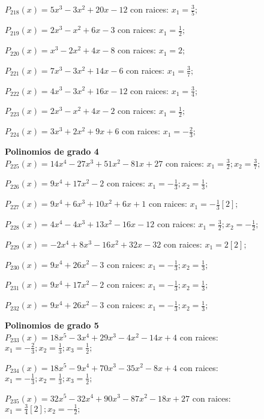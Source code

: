 \subitem $P_{218}(x) = 5x^3 - 3x^2 + 20x - 12$ con raices: $x_1 = \frac{3}{5} ;  $

\subitem $P_{219}(x) = 2x^3 - x^2 + 6x - 3$ con raices: $x_1 = \frac{1}{2} ;  $

\subitem $P_{220}(x) = x^3 - 2x^2 + 4x - 8$ con raices: $x_1 = 2 ;  $

\subitem $P_{221}(x) = 7x^3 - 3x^2 + 14x - 6$ con raices: $x_1 = \frac{3}{7} ;  $

\subitem $P_{222}(x) = 4x^3 - 3x^2 + 16x - 12$ con raices: $x_1 = \frac{3}{4} ;  $

\subitem $P_{223}(x) = 2x^3 - x^2 + 4x - 2$ con raices: $x_1 = \frac{1}{2} ;  $

\subitem $P_{224}(x) = 3x^3 + 2x^2 + 9x + 6$ con raices: $x_1 = -\frac{2}{3} ;  $

\textbf{Polinomios de grado 4\\} 
\subitem $P_{225}(x) = 14x^4 - 27x^3 + 51x^2 - 81x + 27$ con raices: $x_1 = \frac{3}{2} ; x_2 = \frac{3}{7} ;  $

\subitem $P_{226}(x) = 9x^4 + 17x^2 - 2$ con raices: $x_1 = -\frac{1}{3} ; x_2 = \frac{1}{3} ;  $

\subitem $P_{227}(x) = 9x^4 + 6x^3 + 10x^2 + 6x + 1$ con raices: $x_1 = -\frac{1}{3}[2] ;  $

\subitem $P_{228}(x) = 4x^4 - 4x^3 + 13x^2 - 16x - 12$ con raices: $x_1 = \frac{3}{2} ; x_2 = -\frac{1}{2} ;  $

\subitem $P_{229}(x) = -2x^4 + 8x^3 - 16x^2 + 32x - 32$ con raices: $x_1 = 2[2] ;  $

\subitem $P_{230}(x) = 9x^4 + 26x^2 - 3$ con raices: $x_1 = -\frac{1}{3} ; x_2 = \frac{1}{3} ;  $

\subitem $P_{231}(x) = 9x^4 + 17x^2 - 2$ con raices: $x_1 = -\frac{1}{3} ; x_2 = \frac{1}{3} ;  $

\subitem $P_{232}(x) = 9x^4 + 26x^2 - 3$ con raices: $x_1 = -\frac{1}{3} ; x_2 = \frac{1}{3} ;  $

\textbf{Polinomios de grado 5\\} 
\subitem $P_{233}(x) = 18x^5 - 3x^4 + 29x^3 - 4x^2 - 14x + 4$ con raices: $x_1 = -\frac{2}{3} ; x_2 = \frac{1}{3} ; x_3 = \frac{1}{2} ;  $

\subitem $P_{234}(x) = 18x^5 - 9x^4 + 70x^3 - 35x^2 - 8x + 4$ con raices: $x_1 = -\frac{1}{3} ; x_2 = \frac{1}{3} ; x_3 = \frac{1}{2} ;  $

\subitem $P_{235}(x) = 32x^5 - 32x^4 + 90x^3 - 87x^2 - 18x + 27$ con raices: $x_1 = \frac{3}{4}[2] ; x_2 = -\frac{1}{2} ;  $

